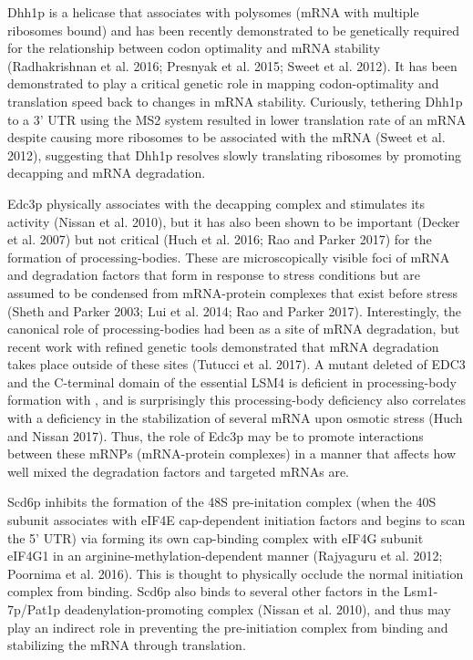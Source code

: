 Dhh1p is a helicase that associates with polysomes (mRNA
with multiple ribosomes bound) and has been recently demonstrated to
be genetically required for the relationship between codon optimality
and mRNA stability (Radhakrishnan et al. 2016; Presnyak et al. 2015;
Sweet et al. 2012). It has been demonstrated to play a critical
genetic role in mapping codon-optimality and translation speed back to
changes in mRNA stability. Curiously, tethering Dhh1p to a 3’ UTR
using the MS2 system resulted in lower translation rate of an mRNA
despite causing more ribosomes to be associated with the mRNA (Sweet
et al. 2012), suggesting that Dhh1p resolves slowly translating
ribosomes by promoting decapping and mRNA degradation.  

Edc3p
physically associates with the decapping complex and stimulates its
activity (Nissan et al. 2010), but it has also been shown to be
important (Decker et al. 2007) but not critical (Huch et al. 2016; Rao
and Parker 2017) for the formation of processing-bodies. These are
microscopically visible foci of mRNA and degradation factors that form
in response to stress conditions but are assumed to be condensed from
mRNA-protein complexes that exist before stress (Sheth and Parker
2003; Lui et al. 2014; Rao and Parker 2017). Interestingly, the
canonical role of processing-bodies had been as a site of mRNA
degradation, but recent work with refined genetic tools demonstrated
that mRNA degradation takes place outside of these sites (Tutucci et
al. 2017). A mutant deleted of EDC3 and the C-terminal domain of the
essential LSM4 is deficient in processing-body formation with , and is
surprisingly this processing-body deficiency also correlates with a
deficiency in the stabilization of several mRNA upon osmotic stress
(Huch and Nissan 2017). Thus, the role of Edc3p may be to promote
interactions between these mRNPs (mRNA-protein complexes) in a manner
that affects how well mixed the degradation factors and targeted mRNAs
are.  

Scd6p inhibits the formation of the 48S pre-initation complex
(when the 40S subunit associates with eIF4E cap-dependent initiation
factors and begins to scan the 5’ UTR) via forming its own cap-binding
complex with eIF4G subunit eIF4G1 in an arginine-methylation-dependent
manner (Rajyaguru et al. 2012; Poornima et al. 2016). This is thought
to physically occlude the normal initiation complex from binding.
Scd6p also binds to several other factors in the Lsm1-7p/Pat1p
deadenylation-promoting complex (Nissan et al. 2010), and thus may
play an indirect role in preventing the pre-initiation complex from
binding and stabilizing the mRNA through translation.  

